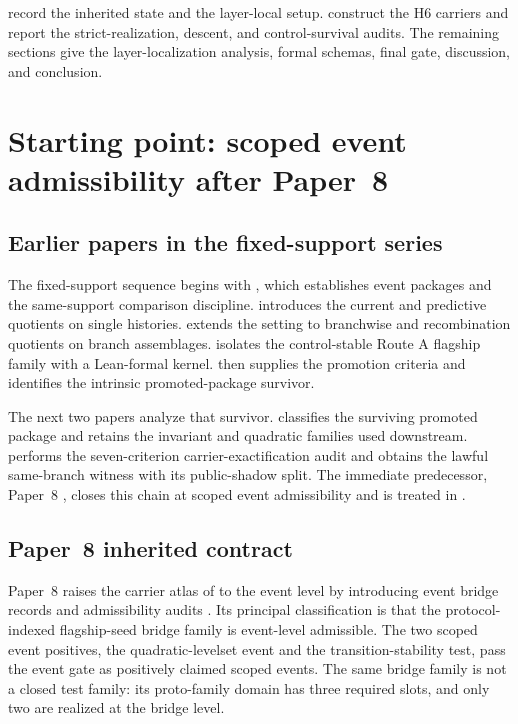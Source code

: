 \documentclass[11pt]{article}
\newcommand{\NewLayer}{H6}
\newcommand{\PaperEight}{Paper~8}
\theoremstyle{definition}
\begin{document}
 record the inherited state and the
layer-local setup.  
construct the \NewLayer{} carriers and report the strict-realization, descent,
and control-survival audits.  The remaining sections give the
layer-localization analysis, formal schemas, final gate, discussion, and
conclusion.
 \section{Starting point: scoped event admissibility after \PaperEight{}}\label{sec:background}

\subsection{Earlier papers in the fixed-support series}\label{subsec:earlier-papers-chain}

The fixed-support sequence begins with
\cite{Tsiokos2026LocallyBoolean}, which establishes event packages and the
same-support comparison discipline.  \cite{Tsiokos2026HolonomyMemory}
introduces the current and predictive quotients on single histories.
\cite{Tsiokos2026MarkingErasureRecombination} extends the setting to
branchwise and recombination quotients on branch assemblages.
\cite{Tsiokos2026RecombinationWitnesses} isolates the control-stable Route A
flagship family with a Lean-formal kernel.  \cite{Tsiokos2026PromotionCriteria}
then supplies the promotion criteria and identifies the intrinsic
promoted-package survivor.

The next two papers analyze that survivor.  \cite{Tsiokos2026InternalStructure}
classifies the surviving promoted package and retains the invariant and
quadratic families used downstream.  \cite{Tsiokos2026CarrierExactification}
performs the seven-criterion carrier-exactification audit and obtains the
lawful same-branch witness with its public-shadow split.  The immediate
predecessor, \PaperEight{} \cite{Tsiokos2026CarrierToEvent}, closes this chain
at scoped event admissibility and is treated in
.

\subsection{\PaperEight{} inherited contract}\label{subsec:paper8-inherited-contract}

\PaperEight{} raises the carrier atlas of
\cite{Tsiokos2026CarrierExactification} to the event level by introducing
event bridge records and admissibility audits
\cite{Tsiokos2026CarrierToEvent}.  Its principal classification is that the
protocol-indexed flagship-seed bridge family is event-level admissible.  The two
scoped event positives, the quadratic-levelset event and the
transition-stability test, pass the event gate as positively claimed scoped
events.  The same bridge family is not a closed test family: its proto-family
domain has three required slots, and only two are realized at the bridge level.
\end{document}
